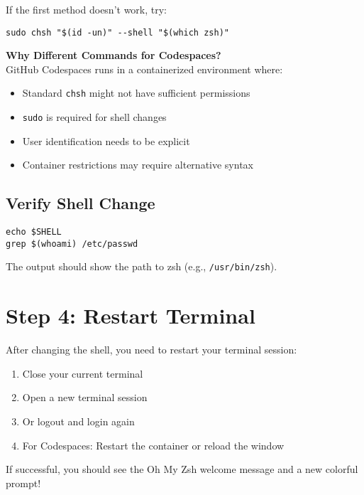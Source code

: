 \documentclass{article}
\begin{document}
If the first method doesn't work, try:

\begin{verbatim}
sudo chsh "$(id -un)" --shell "$(which zsh)"
\end{verbatim}

\begin{infobox}
\textbf{Why Different Commands for Codespaces?}\\
GitHub Codespaces runs in a containerized environment where:
\begin{itemize}
    \item Standard \verb|chsh| might not have sufficient permissions
    \item \verb|sudo| is required for shell changes
    \item User identification needs to be explicit
    \item Container restrictions may require alternative syntax
\end{itemize}
\end{infobox}

\subsection{Verify Shell Change}

\begin{verbatim}
echo $SHELL
grep $(whoami) /etc/passwd
\end{verbatim}

The output should show the path to zsh (e.g., \verb|/usr/bin/zsh|).

\section{Step 4: Restart Terminal}

After changing the shell, you need to restart your terminal session:

\begin{enumerate}
    \item Close your current terminal
    \item Open a new terminal session
    \item Or logout and login again
    \item For Codespaces: Restart the container or reload the window
\end{enumerate}

\begin{successbox}
If successful, you should see the Oh My Zsh welcome message and a new colorful prompt!
\end{successbox}
\end{document}
